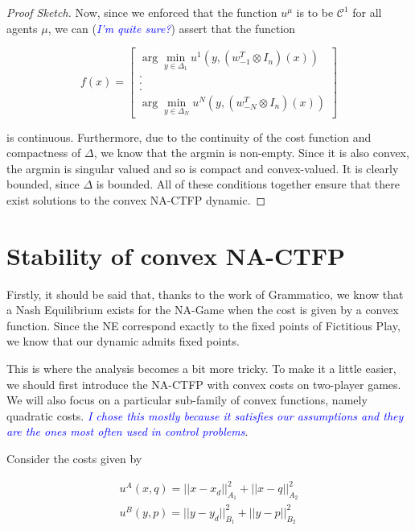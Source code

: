 \documentclass[preprint,12pt]{article}
\theoremstyle{definition}
\theoremstyle{theorem}
\theoremstyle{remark}
\theoremstyle{example}
\newcommand{\ah}[1]{\textcolor{blue}{\textit{#1}}}
\begin{document}
\begin{proof}[Proof Sketch]
	Now, since we enforced that the function $u^\mu$ is to be $\mathcal{C}^1$ for all agents $\mu$, we can (\ah{I'm quite sure?}) assert that the function 
	
	\begin{equation}
		f(x) = \begin{bmatrix}
			\arg\min_{y \in \Delta_1} u^1(y, (w_{-1}^T \otimes I_n) ( x ) ) \\ . \\ . \\ . \\ \arg\min_{y \in \Delta_N} u^N(y, (w_{-N}^T \otimes I_n)( x ))
		\end{bmatrix} 
	\end{equation}
	
	is continuous. Furthermore, due to the continuity of the cost function and compactness of $\Delta$, we know that the argmin is non-empty. Since it is also convex, the argmin is singular valued and so is compact and convex-valued. It is clearly bounded, since $\Delta$ is bounded. All of these conditions together ensure that there exist solutions to the convex NA-CTFP dynamic.
	\end{proof}


	\section{Stability of convex NA-CTFP}
	
	Firstly, it should be said that, thanks to the work of Grammatico, we know that a Nash Equilibrium exists for the NA-Game when the cost is given by a convex function. Since the NE correspond exactly to the fixed points of Fictitious Play, we know that our dynamic admits fixed points.
	
	
	This is where the analysis becomes a bit more tricky. To make it a little easier, we should first introduce the NA-CTFP with convex costs on two-player games. We will also focus on a particular sub-family of convex functions, namely quadratic costs. \ah{I chose this mostly because it satisfies our assumptions and they are the ones most often used in control problems}.
	
	Consider the costs given by
	
	\begin{align}
		u^A(x, q) = || x - x_d ||^2_{A_1} + || x - q ||^2_{A_2} \nonumber \\
		u^B(y, p) = || y - y_d ||^2_{B_1} + || y - p ||^2_{B_2}
	\end{align}
	
\end{document}
